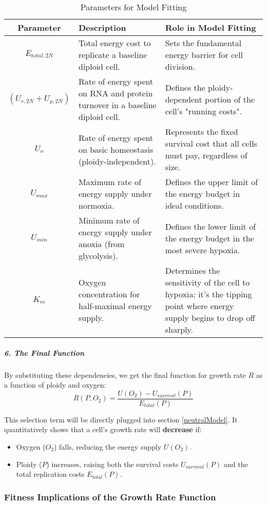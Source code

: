 \documentclass{article}
\begin{document}
\begin{table}[hbt!]
\centering
\caption{Parameters for Model Fitting}
\label{tab:parameters}
\begin{tabular}{|c|p{5cm}|p{6cm}|}
\hline
\textbf{Parameter} & \textbf{Description} & \textbf{Role in Model Fitting} \\
\hline
$E_{total, 2N}$ & Total energy cost to replicate a baseline diploid cell. & Sets the fundamental energy barrier for cell division. \\
\hline
$(U_{r, 2N} + U_{p, 2N})$ & Rate of energy spent on RNA and protein turnover in a baseline diploid cell. & Defines the ploidy-dependent portion of the cell's "running costs". \\
\hline
$U_o$ & Rate of energy spent on basic homeostasis (ploidy-independent). & Represents the fixed survival cost that all cells must pay, regardless of size. \\
\hline
$U_{max}$ & Maximum rate of energy supply under normoxia. & Defines the upper limit of the energy budget in ideal conditions. \\
\hline
$U_{min}$ & Minimum rate of energy supply under anoxia (from glycolysis). & Defines the lower limit of the energy budget in the most severe hypoxia. \\
\hline
$K_m$ & Oxygen concentration for half-maximal energy supply. & Determines the sensitivity of the cell to hypoxia; it's the tipping point where energy supply begins to drop off sharply. \\
\hline
\end{tabular}
\end{table}

\subparagraph{6. The Final Function}
By substituting these dependencies, we get the final function for growth rate $R$ as a function of ploidy and oxygen:
\color{blue}
$$
R(P, O_2) = \frac{U(O_2) - U_{survival}(P)}{E_{total}(P)}
$$

This selection term will be directly plugged into section \ref{neutralModel}. \color{black} It quantitatively shows that a cell's growth rate will \textbf{decrease} if:
\begin{itemize}
    \item Oxygen ($O_2$) falls, reducing the energy supply $U(O_2)$.
    \item Ploidy ($P$) increases, raising both the survival costs $U_{survival}(P)$ and the total replication costs $E_{total}(P)$.
\end{itemize}

\subsubsection*{Fitness Implications of the Growth Rate Function}
\end{document}

